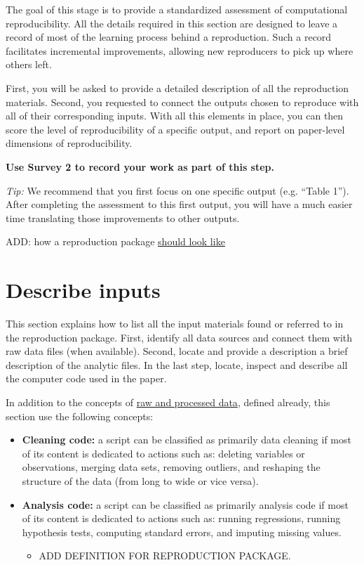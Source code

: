 \documentclass[]{book}
\providecommand{\tightlist}{%
  \setlength{\itemsep}{0pt}\setlength{\parskip}{0pt}}
\begin{document}
The goal of this stage is to provide a standardized assessment of computational reproducibility. All the details required in this section are designed to leave a record of most of the learning process behind a reproduction. Such a record facilitates incremental improvements, allowing new reproducers to pick up where others left.

First, you will be asked to provide a detailed description of all the reproduction materials. Second, you requested to connect the outputs chosen to reproduce with all of their corresponding inputs. With all this elements in place, you can then score the level of reproducibility of a specific output, and report on paper-level dimensions of reproducibility.

\textbf{Use Survey 2 to record your work as part of this step.}

\emph{Tip: }We recommend that you first focus on one specific output (e.g. ``Table 1''). After completing the assessment to this first output, you will have a much easier time translating those improvements to other outputs.

ADD: how a reproduction package \href{https://social-science-data-editors.github.io/guidance/Verification_guidance.html.}{should look like}

\hypertarget{describe-inputs}{%
\section{Describe inputs}\label{describe-inputs}}

This section explains how to list all the input materials found or referred to in the reproduction package. First, identify all data sources and connect them with raw data files (when available). Second, locate and provide a description a brief description of the analytic files. In the last step, locate, inspect and describe all the computer code used in the paper.

In addition to the concepts of \protect\hyperlink{intensive}{raw and processed data}, defined already, this section use the following concepts:

\begin{itemize}
\item
  \textbf{Cleaning code:} a script can be classified as primarily data cleaning if most of its content is dedicated to actions such as: deleting variables or observations, merging data sets, removing outliers, and reshaping the structure of the data (from long to wide or vice versa).
\item
  \textbf{Analysis code:} a script can be classified as primarily analysis code if most of its content is dedicated to actions such as: running regressions, running hypothesis tests, computing standard errors, and imputing missing values.

  \begin{itemize}
  \tightlist
  \item
    ADD DEFINITION FOR REPRODUCTION PACKAGE.
  \end{itemize}
\end{itemize}
\end{document}
